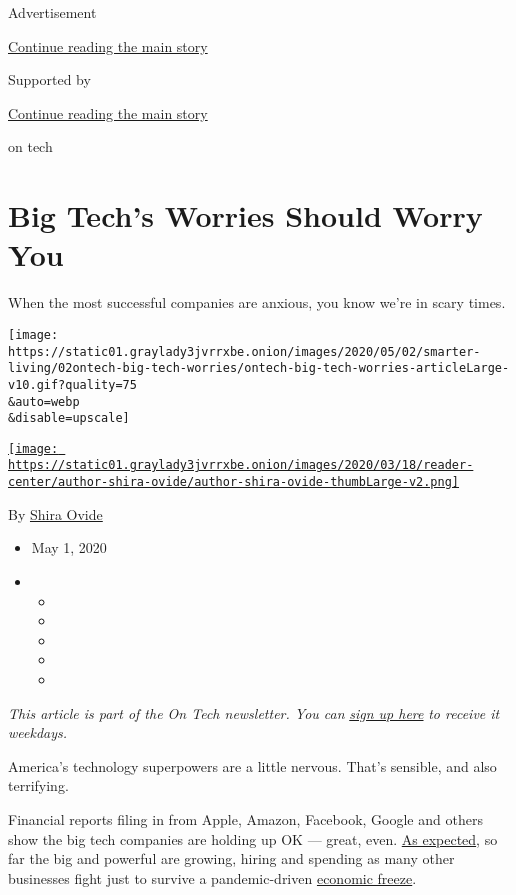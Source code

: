 Advertisement

\protect\hyperlink{after-top}{Continue reading the main story}

Supported by

\protect\hyperlink{after-sponsor}{Continue reading the main story}

on tech

\hypertarget{big-techs-worries-should-worry-you}{%
\section{Big Tech's Worries Should Worry
You}\label{big-techs-worries-should-worry-you}}

When the most successful companies are anxious, you know we're in scary
times.

\texttt{[image: https://static01.graylady3jvrrxbe.onion/images/2020/05/02/smarter-living/02ontech-big-tech-worries/ontech-big-tech-worries-articleLarge-v10.gif?quality=75\\\&auto=webp\\\&disable=upscale]}

\href{https://www.nytimes3xbfgragh.onion/by/shira-ovide}{\texttt{[image: https://static01.graylady3jvrrxbe.onion/images/2020/03/18/reader-center/author-shira-ovide/author-shira-ovide-thumbLarge-v2.png]}}

By \href{https://www.nytimes3xbfgragh.onion/by/shira-ovide}{Shira Ovide}

\begin{itemize}
\item
  May 1, 2020
\item
  \begin{itemize}
  \item
  \item
  \item
  \item
  \item
  \end{itemize}
\end{itemize}

\emph{This article is part of the On Tech newsletter. You can}
\href{https://www.nytimes3xbfgragh.onion/newsletters/signup/OT}{\emph{sign
up here}} \emph{to receive it weekdays.}

America's technology superpowers are a little nervous. That's sensible,
and also terrifying.

Financial reports filing in from Apple, Amazon, Facebook, Google and
others show the big tech companies are holding up OK --- great, even.
\href{https://www.nytimes3xbfgragh.onion/2020/03/23/technology/coronavirus-facebook-amazon-youtube.html}{As
expected}, so far the big and powerful are growing, hiring and spending
as many other businesses fight just to survive a pandemic-driven
\href{https://www.nytimes3xbfgragh.onion/2020/04/29/business/economy/us-gdp.html}{economic
freeze}.

